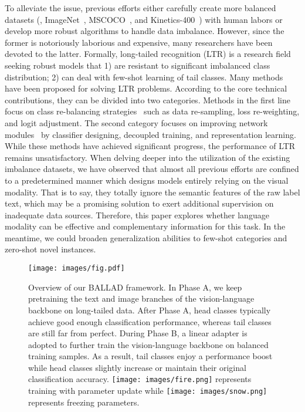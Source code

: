 \documentclass[10pt,twocolumn,letterpaper]{article}
\newcommand{\approach}{\textsc{BALLAD}}
\begin{document}
To alleviate the issue, previous efforts either carefully create more balanced datasets (\eg, ImageNet~\cite{deng2009imagenet}, MSCOCO~\cite{lin2014microsoft}, and Kinetics-400~\cite{kay2017kinetics}) with human labors or develop more robust algorithms to handle data imbalance. However, since the former is notoriously laborious and expensive, many researchers have been devoted to the latter. Formally, long-tailed recognition (LTR) is a research field seeking robust models that 1) are resistant to significant imbalanced class distribution; 2) can deal with few-shot learning of tail classes.
Many methods~\cite{zhang2021deep} have been proposed for solving LTR problems. According to the core technical contributions, they can be divided into two categories. Methods in the first line focus on class re-balancing strategies~\cite{menon2021longtail,hong2021disentangling,zhang2021distribution,kang2019few} such as data re-sampling, loss re-weighting, and logit adjustment. The second category focuses on improving network modules~\cite{cui2021parametric,Kang2020Decoupling,zhang2021test,Samuel_2021_ICCV,tang2020long,cui2021reslt,zhou2020bbn} by classifier designing, decoupled training, and representation learning. 
While these methods have achieved significant progress, the performance of LTR remains unsatisfactory. When delving deeper into the utilization of the existing imbalance datasets, we have observed that almost all previous efforts are confined to a predetermined manner which designs models entirely relying on the visual modality. That is to say, they totally ignore the semantic features of the raw label text, which may be a promising solution to exert additional supervision on inadequate data sources. 
Therefore, this paper explores whether language modality can be effective and complementary information for this task. In the meantime, we could broaden generalization abilities to few-shot categories and zero-shot novel instances.




\begin{figure*}[ht!]
\centering
\texttt{[image: images/fig.pdf]}
\vspace*{-13pt}
\caption{Overview of our \approach{} framework. In Phase A, we keep pretraining the text and image branches of the vision-language backbone on long-tailed data. After Phase A, head classes typically achieve good enough classification performance, whereas tail classes are still far from perfect. During Phase B, a linear adapter is adopted to further train the vision-language backbone on balanced training samples. As a result, tail classes enjoy a performance boost while head classes slightly increase or maintain their original classification accuracy.
\texttt{[image: images/fire.png]} represents training with parameter update while \texttt{[image: images/snow.png]} represents freezing parameters.}
\vspace*{-13pt}
\label{fig:1}
\end{figure*}
\end{document}
